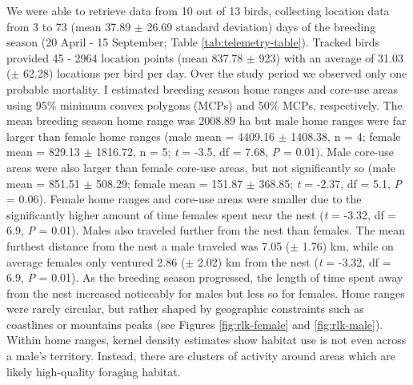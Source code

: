 \documentclass{sfuthesis}
\begin{document}
We were able to retrieve data from 10 out of 13 birds, collecting location data from 3 to 73 (mean 37.89 \(\pm\) 26.69 standard deviation) days of the breeding season (20 April - 15 September; Table \ref{tab:telemetry-table}). Tracked birds provided 45 - 2964 location points (mean 837.78 \(\pm\) 923) with an average of 31.03 (\(\pm\) 62.28) locations per bird per day. Over the study period we observed only one probable mortality. I estimated breeding season home ranges and core-use areas using 95\% minimum convex polygons (MCPs) and 50\% MCPs, respectively. The mean breeding season home range was 2008.89 ha but male home ranges were far larger than female home ranges (male mean = 4409.16 \(\pm\) 1408.38, n = 4; female mean = 829.13 \(\pm\) 1816.72, n = 5; \emph{t} = -3.5, df = 7.68, \emph{P} = 0.01). Male core-use areas were also larger than female core-use areas, but not significantly so (male mean = 851.51 \(\pm\) 508.29; female mean = 151.87 \(\pm\) 368.85; \emph{t} = -2.37, df = 5.1, \emph{P} = 0.06). Female home ranges and core-use areas were smaller due to the significantly higher amount of time females spent near the nest (\emph{t} = -3.32, df = 6.9, \emph{P} = 0.01). Males also traveled further from the nest than females. The mean furthest distance from the nest a male traveled was 7.05 (\(\pm\) 1.76) km, while on average females only ventured 2.86 (\(\pm\) 2.02) km from the nest (\emph{t} = -3.32, df = 6.9, \emph{P} = 0.01). As the breeding season progressed, the length of time spent away from the nest increased noticeably for males but less so for females. Home ranges were rarely circular, but rather shaped by geographic constraints such as coastlines or mountains peaks (see Figures \ref{fig:rlk-female} and \ref{fig:rlk-male}). Within home ranges, kernel density estimates show habitat use is not even across a male's territory. Instead, there are clusters of activity around areas which are likely high-quality foraging habitat.
\end{document}

